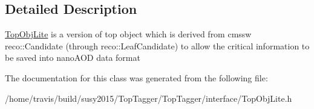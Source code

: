 \subsection{Detailed Description}
\hyperlink{classTopObjLite}{Top\-Obj\-Lite} is a version of top object which is derived from cmssw reco\-::\-Candidate (through reco\-::\-Leaf\-Candidate) to allow the critical information to be saved into nano\-A\-O\-D data format 

The documentation for this class was generated from the following file\-:\begin{DoxyCompactItemize}
\item 
/home/travis/build/susy2015/\-Top\-Tagger/\-Top\-Tagger/interface/Top\-Obj\-Lite.\-h\end{DoxyCompactItemize}
